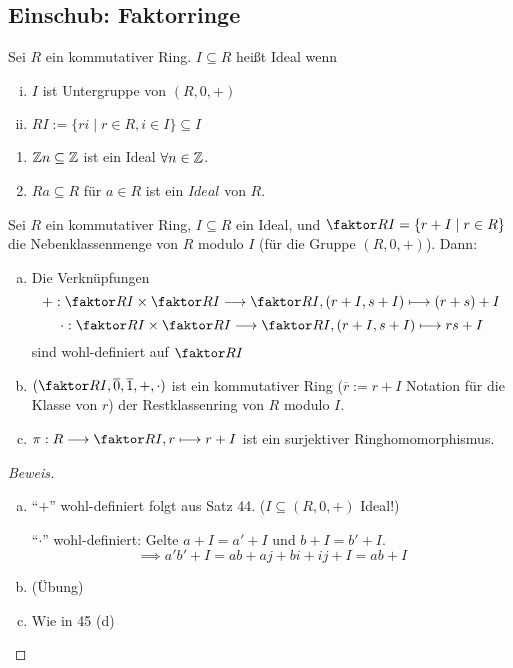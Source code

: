 \documentclass[a4paper]{report}
\begin{document}
\subsection*{Einschub: Faktorringe}
\begin{defi}
  Sei $R$ ein kommutativer Ring. $I \subseteq R$ heißt Ideal wenn
  \begin{enumerate}[(i)]
    \item $I$ ist Untergruppe von $(R, 0, +)$
    \item $RI := \{ri \mid r \in R, i \in I\} \subseteq I$
  \end{enumerate}
\end{defi}
\begin{bsp*}
  \begin{enumerate}[1)]
    \item $\Bbb Zn \subseteq \Bbb Z$ ist ein Ideal $\forall n \in \Bbb Z$.
    \item $Ra \subseteq R$ für $a \in R$ ist ein $Ideal$ von $R$.
  \end{enumerate}
\end{bsp*}

\begin{satz}
  Sei $R$ ein kommutativer Ring, $I \subseteq R$ ein Ideal, und $\faktor RI = \{r + I \mid r \in R\}$ die Nebenklassenmenge von $R$ modulo $I$ (für die Gruppe $(R, 0, +)$). Dann:
  \begin{enumerate}[(a)]
    \item Die Verknüpfungen $$+ : \faktor RI \times \faktor RI \longrightarrow \faktor RI, (r+I, s+I) \longmapsto (r+s)+I$$
          $$\cdot : \faktor RI \times \faktor RI \longrightarrow \faktor RI, (r+I, s+I) \longmapsto rs+I$$
          sind wohl-definiert auf $\faktor RI$

    \item $(\faktor RI, \overline 0, \overline 1, +, \cdot)$ ist ein kommutativer Ring ($\overline r := r + I$ Notation für die Klasse von $r$) der Restklassenring von $R$ modulo $I$.
    \item $\pi : R \longrightarrow \faktor RI, r \longmapsto r+I$ ist ein surjektiver Ringhomomorphismus.
  \end{enumerate}
\begin{proof}[Beweis]
\begin{enumerate}[(a)]
  \item ``$+$'' wohl-definiert folgt aus Satz 44. ($I \subseteq (R, 0, +)$ Ideal!)

        ``$\cdot$''  wohl-definiert: Gelte $a+I = a'+I$ und $b+I = b'+I$.
        $$\implies a'b' + I = ab + aj + bi + ij + I = ab + I$$
  \item (Übung)
  \item Wie in 45 (d)
\end{enumerate}
\end{proof}
\end{satz}
\end{document}
